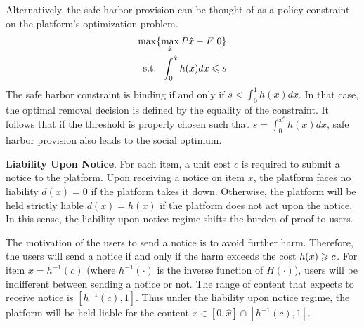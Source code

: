 Alternatively, the safe harbor provision can be thought of as a policy constraint on the platform's optimization problem. 
\begin{eqnarray}\label{eqn:profit_sh}
\max &&
\hspace{-1em} \{\max_{\hat{x}}P\hat{x}-F,0\}\nn\\
\mbox{s.t.} &&\hspace{-1em} \int_0^{\hat{x}}h(x)dx\ls s %
\end{eqnarray}
The safe harbor constraint is binding if and only if $s<\int_0^1 h(x)dx$. In that case, the optimal removal decision is defined by the equality of the constraint. It follows that if the threshold is properly chosen such that $s=\int_0^{x^e}h(x)dx$, safe harbor provision also leads to the social optimum. 


\textbf{Liability Upon Notice}.
For each item, a unit cost $c$ is required to submit a notice to the platform. Upon receiving a notice on item $x$, the platform faces no liability $d(x)=0$ if the platform takes it down. Otherwise, the platform will be held strictly liable $d(x)=h(x)$ if the platform does not act upon the notice. In this sense, the liability upon notice regime shifts the burden of proof to users. 

The motivation of the users to send a notice is to avoid further harm. Therefore, the users will send a notice if and only if the harm exceeds the cost $h(x)\geqslant c$. For item $x=h^{-1}(c)$ (where $h^{-1}(\cdot)$ is the inverse function of $H(\cdot)$), users will be indifferent between sending a notice or not. The range of content that expects to receive notice is $[h^{-1}(c),1]$.
Thus under the liability upon notice regime, the platform will be held liable for the content $x\in [0,\hat{x}]\cap[h^{-1}(c),1]$.  

